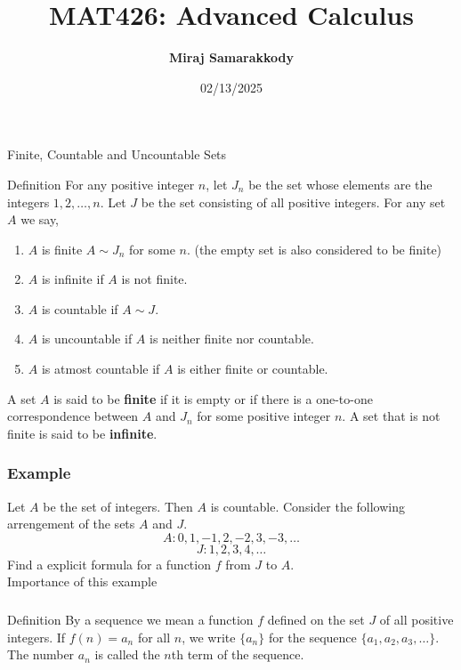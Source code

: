 \documentclass{beamer}
\title{MAT426: Advanced Calculus}
\author{\textbf{Miraj Samarakkody}}
\institute{Tougaloo College}
\date{02/13/2025}
\begin{document}
\begin{frame}
    \titlepage
\end{frame}

\begin{frame}{Finite, Countable and Uncountable Sets}
    \begin{block}{Definition}
        For any positive integer \(n\), let \(J_n\) be the set whose elements are the integers \(1, 2, \ldots, n\). Let \(J\) be the set consisting of all positive integers. For any set \(A\) we say, 
        \begin{enumerate}
            \item \(A\) is finite \(A \sim J_n\) for some \(n\). (the empty set is also considered to be finite)
            \item \(A\) is infinite if \(A\) is not finite.
            \item \(A\) is countable if \(A \sim J\). 
            \item \(A\) is uncountable if \(A\) is neither finite nor countable.
            \item \(A\) is atmost countable if \(A\) is either finite or countable.
        \end{enumerate}
    \end{block}
    A set \(A\) is said to be \textbf{finite} if it is empty or if there is a one-to-one correspondence between \(A\) and \(J_n\) for some positive integer \(n\). A set that is not finite is said to be \textbf{infinite}.

\end{frame}

\begin{frame}
    \frametitle{Example}
    Let \(A\) be the set of integers. Then \(A\) is countable. Consider the following arrengement of the sets \(A\) and \(J\). 
    \[
    A:0,1,-1,2,-2,3,-3,\dots
    \]
    \[J: 1,2,3,4, \dots\]
    Find a explicit formula for a function \(f\) from \(J\) to \(A\).\\ \pause
    \vspace{0.1in}
    Importance of this example
\end{frame}

\begin{frame}
    \frametitle{}
\begin{block}{Definition}
    By a sequence we mean a function \(f\) defined on the set \(J\) of all positive integers. If \(f(n) = a_n\) for all \(n\), we write \(\{a_n\}\) for the sequence \(\{a_1, a_2, a_3, \ldots\}\). The number \(a_n\) is called the \(n\)th term of the sequence.
\end{block}
    

\end{frame}
\end{document}
